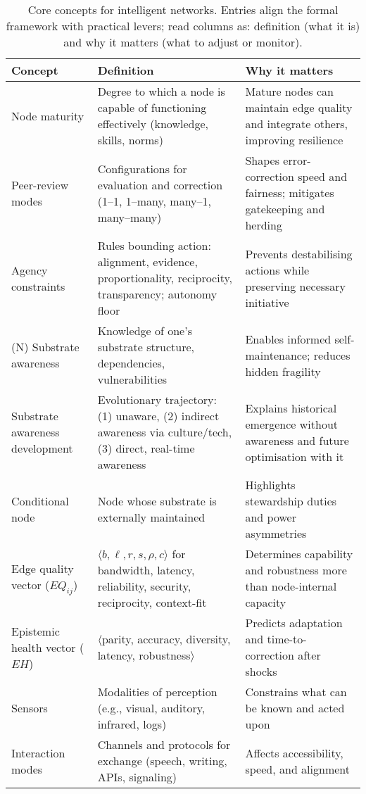 \documentclass[12pt]{article}
\begin{document}
\begin{table}[htbp]
\centering
\small
\caption{Core concepts for intelligent networks. Entries align the formal framework with practical levers; read columns as: definition (what it is) and why it matters (what to adjust or monitor).}
\label{tab:concepts}
\begin{tabularx}{\linewidth}{lYY}
\toprule
\textbf{Concept} & \textbf{Definition} & \textbf{Why it matters} \\
\midrule
Node maturity & Degree to which a node is capable of functioning effectively (knowledge, skills, norms) & Mature nodes can maintain edge quality and integrate others, improving resilience \\
Peer-review modes & Configurations for evaluation and correction (1--1, 1--many, many--1, many--many) & Shapes error-correction speed and fairness; mitigates gatekeeping and herding \\
Agency constraints & Rules bounding action: alignment, evidence, proportionality, reciprocity, transparency; autonomy floor & Prevents destabilising actions while preserving necessary initiative \\ (N)
Substrate awareness & Knowledge of one's substrate structure, dependencies, vulnerabilities & Enables informed self-maintenance; reduces hidden fragility \\
Substrate awareness development & Evolutionary trajectory: (1) unaware, (2) indirect awareness via culture/tech, (3) direct, real-time awareness & Explains historical emergence without awareness and future optimisation with it \\
Conditional node & Node whose substrate is externally maintained & Highlights stewardship duties and power asymmetries \\
Edge quality vector ($EQ_{ij}$) & $\langle b,\ell,r,s,\rho,c\rangle$ for bandwidth, latency, reliability, security, reciprocity, context-fit & Determines capability and robustness more than node-internal capacity \\
Epistemic health vector ($EH$) & $\langle$parity, accuracy, diversity, latency, robustness$\rangle$ & Predicts adaptation and time-to-correction after shocks \\
Sensors & Modalities of perception (e.g., visual, auditory, infrared, logs) & Constrains what can be known and acted upon \\
Interaction modes & Channels and protocols for exchange (speech, writing, APIs, signaling) & Affects accessibility, speed, and alignment \\

\end{tabularx}
\end{table}
\end{document}
